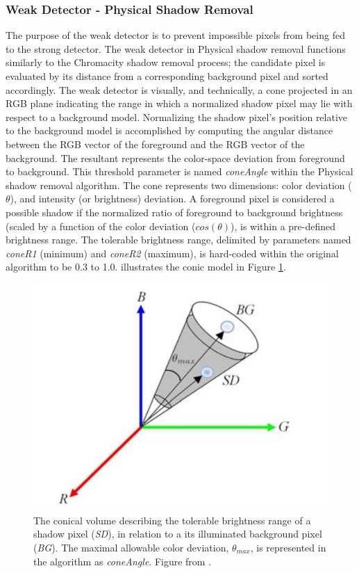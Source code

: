 \subsubsection{Weak Detector - Physical Shadow Removal}

The purpose of the weak detector is to prevent impossible pixels from being fed to the strong detector. The weak detector in Physical shadow removal functions similarly to the Chromacity shadow removal process; the candidate pixel is evaluated by its distance from a corresponding background pixel and sorted accordingly. The weak detector is visually, and technically, a cone projected in an RGB plane indicating the range in which a normalized shadow pixel may lie with respect to a background model. Normalizing the shadow pixel's position relative to the background model is accomplished by computing the angular distance between the RGB vector of the foreground and the RGB vector of the background. The resultant represents the color-space deviation from foreground to background. This threshold parameter is named \textit{coneAngle} within the Physical shadow removal algorithm. The cone represents two dimensions: color deviation ($\theta$), and intensity (or brightness) deviation. A foreground pixel is considered a possible shadow if the normalized ratio of foreground to background brightness (scaled by a function of the color deviation ($cos(\theta)$), is within a pre-defined brightness range. The tolerable brightness range, delimited by parameters named \textit{coneR1} (minimum) and \textit{coneR2} (maximum), is hard-coded within the original algorithm to be 0.3 to 1.0. \cite{huang2009moving} illustrates the conic model in Figure \ref{fig:cone_physical}.

\begin{figure}
  \centering
  \includegraphics[width=.8\linewidth]{figures/cone_physical.jpg}
  \caption{The conical volume describing the tolerable brightness range of a shadow pixel (\textit{SD}), in relation to a its illuminated background pixel (\textit{BG}). The maximal allowable color deviation, $\theta_{max}$, is represented in the algorithm as \textit{coneAngle}. Figure from \cite{huang2009moving}.}
  \label{fig:cone_physical}
\end{figure}

